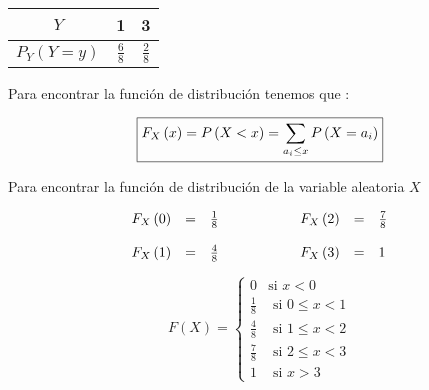 \documentclass[12pt]{article}
\begin{document}
\begin{center}
    \renewcommand{\arraystretch}{1.5}
    \begin{tabular}{|c|c|c|}
        \hline
        $Y$                   & 1             & 3
        \\
        \hline
        $P_Y\left(Y=y\right)$ & $\frac{6}{8}$ & $\frac{2}{8}$
        \\
        \hline
    \end{tabular}
\end{center}


\begin{flushleft}
    Para encontrar la funci\'on de distribuci\'on tenemos que :
\end{flushleft}



\begin{equation*}
    \fbox{$\displaystyle
            F_X\left(x\right) = P \left(X <x\right) =  \sum_{a_i\le x} P \left(X = a_i\right)
        $}
\end{equation*}


\begin{flushleft}
    Para encontrar la funci\'on de distribuci\'on de la variable aleatoria $X$
\end{flushleft}


\begin{equation*}
    \begin{array}{cp{1cm}c}


        \begin{array}{rcl}
            F_X\left(0\right) & = & \frac{1}{8}
            \\
            \\
            F_X\left(1\right) & = & \frac{4}{8}
        \end{array}
         &
         &
        \begin{array}{rcl}
            F_X\left(2\right) & = & \frac{7}{8}
            \\
            \\
            F_X\left(3\right) & = & 1
        \end{array}
    \end{array}
\end{equation*}


\begin{equation*}
    F\left(X\right) = \begin{cases}
        0           & \mbox{si   $x < 0 $}
        \\
        \frac{1}{8} & \mbox{   si   $0\le x < 1$}
        \\
        \frac{4}{8} & \mbox{   si   $1\le x < 2$}
        \\
        \frac{7}{8} & \mbox{   si   $2\le x < 3$}
        \\
        1           & \mbox{     si   $x>3$}
    \end{cases}
\end{equation*}
\end{document}
